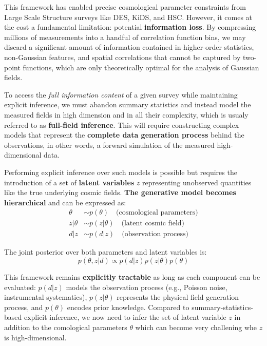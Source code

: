 \documentclass[11pt,a4paper]{article}
\theoremstyle{definition}
\begin{document}
This framework has enabled precise cosmological parameter constraints from Large Scale Structure surveys like DES, KiDS, and HSC. However, it comes at the cost a fundamental limitation: potential \textbf{information loss}. By compressing millions of measurements into a handful of correlation function bins, we may discard a significant amount of information contained in higher-order statistics, non-Gaussian features, and spatial correlations that cannot be captured by two-point functions, which are only theoretically optimal for the analysis of Gaussian fields.

To access the \textit{full information content} of a given survey while maintaining explicit inference, we must abandon summary statistics and instead model the measured fields in high dimension and in all their complexity, which is usualy referred to as \textbf{full-field inference}. This will require constructing complex models that represent the \textbf{complete data generation process} behind the observations, in other words, a forward simulation of the measured high-dimensional data.

Performing explicit inference over such models is possible but requires the introduction of a set of \textbf{latent variables} $z$ representing unobserved quantities like the true underlying cosmic fields. \textbf{The generative model becomes hierarchical} and can be expressed as:
\begin{align}
    \theta &\sim p(\theta) \quad \text{(cosmological parameters)} \\
    z|\theta &\sim p(z|\theta) \quad \text{(latent cosmic field)} \\
    d|z &\sim p(d|z) \quad \text{(observation process)}
\end{align}

The joint posterior over both parameters and latent variables is:
\begin{equation}
    p(\theta, z|d) \propto p(d|z)p(z|\theta)p(\theta)
\end{equation}

This framework remains \textbf{explicitly tractable} as long as each component can be evaluated: $p(d|z)$ models the observation process (e.g., Poisson noise, instrumental systematics), $p(z|\theta)$ represents the physical field generation process, and $p(\theta)$ encodes prior knowledge. Compared to summary-statistics-based explicit inference, we now need to infer the set of latent variable $z$ in addition to the comological parameters $\theta$ which can become very challening whe $z$ is high-dimensional. 
\end{document}
